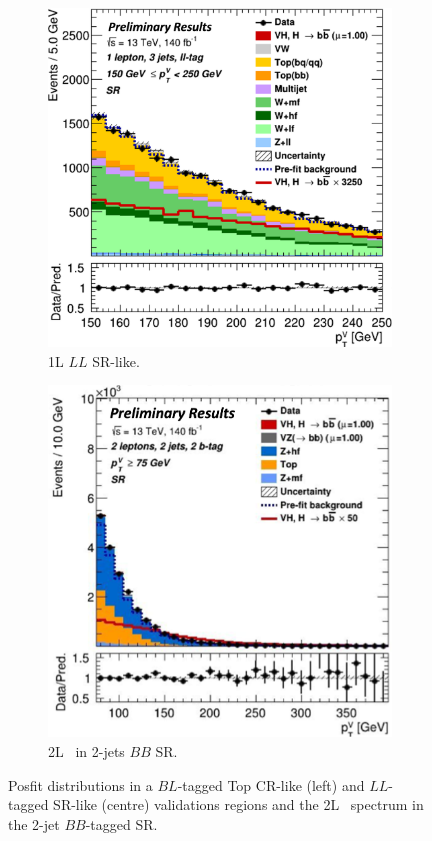 \begin{figure}[h!]
\begin{subfigure}[b]{0.32\textwidth}
        \includegraphics[width=\textwidth]{Images/VH/Fit/fromSlides/Postfit/1L_LLSR.png}
        \caption{1L $LL$ SR-like.}
        \label{fig:val_LLSR}
    \end{subfigure}
    \begin{subfigure}[b]{0.32\textwidth}
      \centering
      \includegraphics[width=\textwidth]{Images/VH/Fit/fromSlides/Postfit/2LBB.png}
      \caption{2L \ptv\ in 2-jets $BB$ SR.}
      \label{fig:fit_ptv2L}
    \end{subfigure} 
    \caption{Posfit distributions in a $BL$-tagged Top CR-like (left) and $LL$-tagged SR-like (centre) validations regions and the 2L \ptv\ spectrum in the 2-jet $BB$-tagged SR.}
    \label{fig:postfitval}
\end{figure} 



